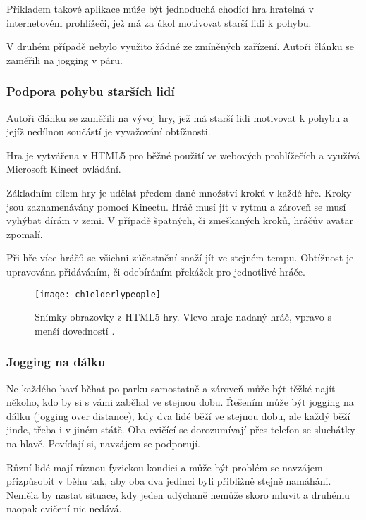 Příkladem takové aplikace může být jednoduchá chodící hra hratelná v internetovém prohlížeči, jež má za úkol motivovat starší lidi k pohybu.

V druhém případě nebylo využito žádné ze zmíněných zařízení. Autoři článku \cite{7} se zaměřili na jogging v páru. 

\subsubsection{Podpora pohybu starších lidí}

Autoři článku \cite{8} se zaměřili na vývoj hry, jež má starší lidi motivovat k pohybu a jejíž nedílnou součástí je vyvažování obtížnosti. 

Hra je vytvářena v HTML5 pro běžné použití ve webových prohlížečích a využívá Microsoft Kinect ovládání.

Základním cílem hry je udělat předem dané množství kroků v každé hře. Kroky jsou zaznamenávány pomocí Kinectu. Hráč musí jít v rytmu a zároveň se musí vyhýbat dírám v zemi. V případě špatných, či zmeškaných kroků, hráčův avatar zpomalí.

Při hře více hráčů se všichni zúčastnění snaží jít ve stejném tempu. Obtížnost je upravována přidáváním, či odebíráním překážek pro jednotlivé hráče.

\begin{figure}
  \centering
  \texttt{[image: ch1elderlypeople]}
	\caption{Snímky obrazovky z HTML5 hry. Vlevo hraje nadaný hráč, vpravo s menší dovedností \cite{8}. }
	\label{ch1elderlypeople}
\end{figure}

\subsubsection{Jogging na dálku}

Ne každého baví běhat po parku samostatně a zároveň může být těžké najít někoho, kdo by si s vámi zaběhal ve stejnou dobu. Řešením může být jogging na dálku (jogging over distance), kdy dva lidé běží ve stejnou dobu, ale každý běží jinde, třeba i v jiném státě. Oba cvičící se dorozumívají přes telefon se sluchátky na hlavě. Povídají si, navzájem se podporují.

Různí lidé mají různou fyzickou kondici a může být problém se navzájem přizpůsobit v běhu tak, aby oba dva jedinci byli přibližně stejně namáháni. Neměla by nastat situace, kdy jeden udýchaně nemůže skoro mluvit a druhému naopak cvičení nic nedává.

